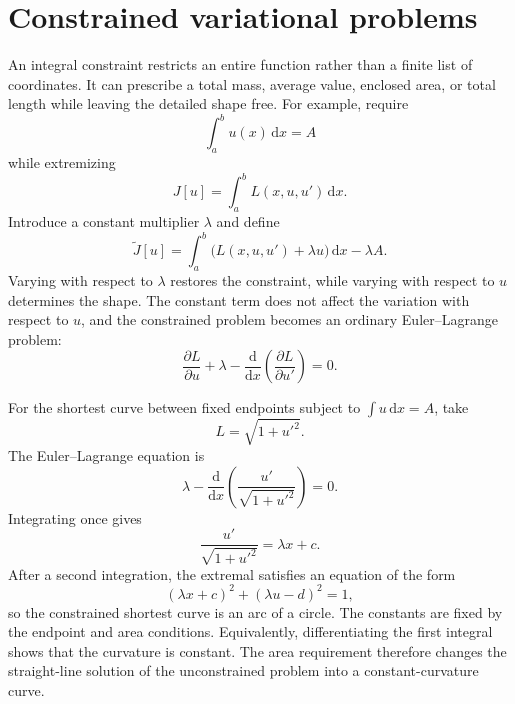 \section{Constrained variational problems}

An integral constraint restricts an entire function rather than a finite list of coordinates. It can prescribe a total mass, average value, enclosed area, or total length while leaving the detailed shape free. For example, require
\begin{equation}
\int_a^b u(x)\,\mathrm{d}x=A
\end{equation}
while extremizing
\begin{equation}
J[u]=\int_a^b L(x,u,u')\,\mathrm{d}x.
\end{equation}
Introduce a constant multiplier $\lambda$ and define
\begin{equation}
\widetilde J[u]=\int_a^b\bigl(L(x,u,u')+\lambda u\bigr)\,\mathrm{d}x-\lambda A.
\end{equation}
Varying with respect to $\lambda$ restores the constraint, while varying with respect to $u$ determines the shape. The constant term does not affect the variation with respect to $u$, and the constrained problem becomes an ordinary Euler--Lagrange problem:
\begin{equation}
\frac{\partial L}{\partial u}+\lambda
-\frac{\mathrm{d}}{\mathrm{d}x}\left(\frac{\partial L}{\partial u'}\right)=0.
\end{equation}

\begin{example}
For the shortest curve between fixed endpoints subject to $\int u\,\mathrm{d}x=A$, take
\begin{equation}
L=\sqrt{1+u'^2}.
\end{equation}
The Euler--Lagrange equation is
\begin{equation}
\lambda-\frac{\mathrm{d}}{\mathrm{d}x}
\left(\frac{u'}{\sqrt{1+u'^2}}\right)=0.
\end{equation}
Integrating once gives
\begin{equation}
\frac{u'}{\sqrt{1+u'^2}}=\lambda x+c.
\end{equation}
After a second integration, the extremal satisfies an equation of the form
\begin{equation}
(\lambda x+c)^2+(\lambda u-d)^2=1,
\end{equation}
so the constrained shortest curve is an arc of a circle. The constants are fixed by the endpoint and area conditions. Equivalently, differentiating the first integral shows that the curvature is constant. The area requirement therefore changes the straight-line solution of the unconstrained problem into a constant-curvature curve.
\end{example}

